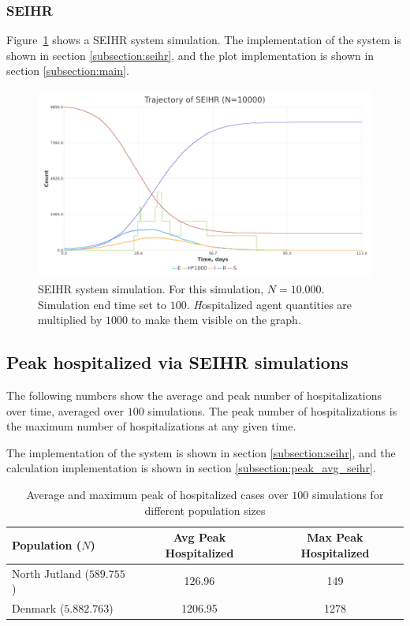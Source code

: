 \subsubsection{SEIHR}
Figure~\ref{fig:seihr_sim} shows a SEIHR system simulation.
The implementation of the system is shown in section \ref{subsection:seihr}, and the plot implementation is shown in section \ref{subsection:main}.

\begin{figure}[H]
\centering
\includegraphics[width=1\textwidth,height=\textheight,keepaspectratio]{images/seihr.png}
\caption{SEIHR system simulation. For this simulation, $N=10.000$. Simulation end time set to $100$. \textit{H}ospitalized agent quantities are multiplied by $1000$ to make them visible on the graph.}
\label{fig:seihr_sim}
\end{figure}

\subsection{Peak hospitalized via SEIHR simulations}
The following numbers show the average and peak number of hospitalizations over time, averaged over $100$ simulations.
The peak number of hospitalizations is the maximum number of hospitalizations at any given time.

The implementation of the system is shown in section \ref{subsection:seihr}, and the calculation implementation is shown in section \ref{subsection:peak_avg_seihr}.

\begin{table}[ht]
\centering
\begin{tabular}{|l|c|c|}
\hline
\textbf{Population ($N$)} & \textbf{Avg Peak Hospitalized} & \textbf{Max Peak Hospitalized} \\
\hline
North Jutland ($589.755$) & 126.96 & 149 \\
\hline
Denmark ($5.882.763$) & 1206.95 & 1278 \\
\hline
\end{tabular}
\caption{Average and maximum peak of hospitalized cases over $100$ simulations for different population sizes}
\end{table}

